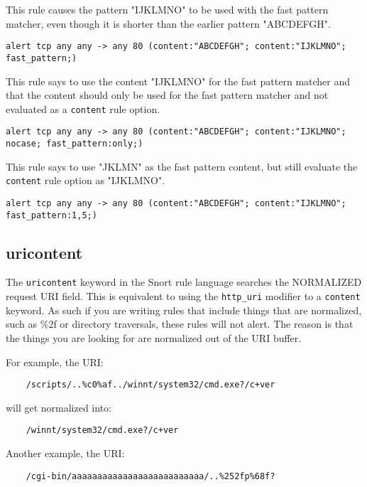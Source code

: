 \documentclass[english]{report}
\begin{document}
This rule causes the pattern "IJKLMNO" to be used with the fast pattern matcher,
even though it is shorter than the earlier pattern "ABCDEFGH".

\begin{verbatim}
alert tcp any any -> any 80 (content:"ABCDEFGH"; content:"IJKLMNO"; fast_pattern;)
\end{verbatim}

This rule says to use the content "IJKLMNO" for the fast pattern matcher and that
the content should only be used for the fast pattern matcher and not evaluated
as a \texttt{content} rule option.
\begin{verbatim}
alert tcp any any -> any 80 (content:"ABCDEFGH"; content:"IJKLMNO"; nocase; fast_pattern:only;)
\end{verbatim}

This rule says to use "JKLMN" as the fast pattern content, but still evaluate
the \texttt{content} rule option as "IJKLMNO".
\begin{verbatim}
alert tcp any any -> any 80 (content:"ABCDEFGH"; content:"IJKLMNO"; fast_pattern:1,5;)
\end{verbatim}

\subsection{uricontent}
\label{sub:UriContent}

The \texttt{uricontent} keyword in the Snort rule language searches the
NORMALIZED request \textsc{URI} field.  This is equivalent to using the
\texttt{http\_uri} modifier to a \texttt{content} keyword.  As such if you
are writing rules that include things that are normalized, such as \%2f or
directory traversals, these rules will not alert.  The reason is that the
things you are looking for are normalized out of the URI buffer.  

For example, the URI: 

\begin{verbatim}
    /scripts/..%c0%af../winnt/system32/cmd.exe?/c+ver
\end{verbatim}

will get normalized into:

\begin{verbatim}
    /winnt/system32/cmd.exe?/c+ver
\end{verbatim}

Another example, the URI:

\begin{verbatim}
    /cgi-bin/aaaaaaaaaaaaaaaaaaaaaaaaaa/..%252fp%68f?
\end{verbatim}
\end{document}
